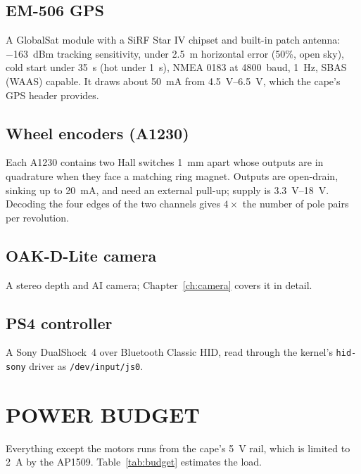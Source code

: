 \subsection{EM-506 GPS}

A GlobalSat module with a SiRF Star IV chipset and built-in patch antenna:
\SI{-163}{dBm} tracking sensitivity, under \SI{2.5}{m} horizontal error (50\%,
open sky), cold start under \SI{35}{s} (hot under \SI{1}{s}), NMEA 0183 at
\SI{4800}{baud}, \SI{1}{Hz}, SBAS (WAAS) capable. It draws about
\SI{50}{mA} from \SIrange{4.5}{6.5}{V}, which the cape's GPS header provides.

\subsection{Wheel encoders (A1230)}

Each A1230 contains two Hall switches \SI{1}{mm} apart whose outputs are in
quadrature when they face a matching ring magnet. Outputs are open-drain,
sinking up to \SI{20}{mA}, and need an external pull-up; supply is
\SIrange{3.3}{18}{V}. Decoding the four edges of the two channels gives
$4\times$ the number of pole pairs per revolution.

\subsection{OAK-D-Lite camera}

A stereo depth and AI camera; Chapter~\ref{ch:camera} covers it in detail.

\subsection{PS4 controller}

A Sony DualShock~4 over Bluetooth Classic HID, read through the kernel's
\texttt{hid-sony} driver as \texttt{/dev/input/js0}.

\section{POWER BUDGET}
\label{sec:powerbudget}

Everything except the motors runs from the cape's \SI{5}{V} rail, which is
limited to \SI{2}{A} by the AP1509. Table~\ref{tab:budget} estimates the
load.

